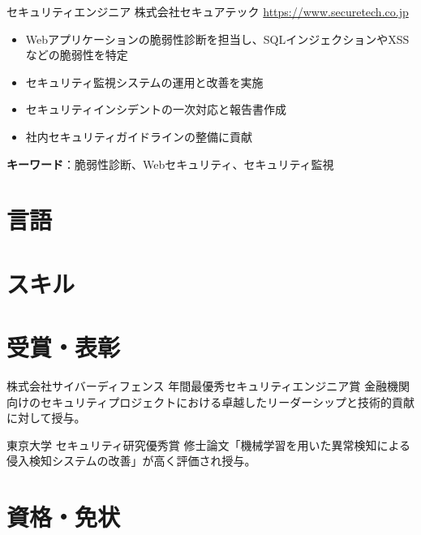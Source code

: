 \documentclass[a4paper, serif, 10pt]{moderncv}
\begin{document}
        {セキュリティエンジニア}
        {株式会社セキュアテック}
        {\url{https://www.securetech.co.jp}}
        {}
        {\begin{itemize}
\item Webアプリケーションの脆弱性診断を担当し、SQLインジェクションやXSSなどの脆弱性を特定
\item セキュリティ監視システムの運用と改善を実施
\item セキュリティインシデントの一次対応と報告書作成
\item 社内セキュリティガイドラインの整備に貢献
\end{itemize}
\textbf{キーワード}：脆弱性診断、Webセキュリティ、セキュリティ監視}
\section{言語}

\section{スキル}

\section{受賞・表彰}

        {株式会社サイバーディフェンス}
        {年間最優秀セキュリティエンジニア賞}
        {}
        {}
        {金融機関向けのセキュリティプロジェクトにおける卓越したリーダーシップと技術的貢献に対して授与。}

        {東京大学}
        {セキュリティ研究優秀賞}
        {}
        {}
        {修士論文「機械学習を用いた異常検知による侵入検知システムの改善」が高く評価され授与。}
\section{資格・免状}
\end{document}
